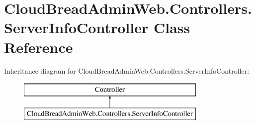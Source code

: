 \hypertarget{class_cloud_bread_admin_web_1_1_controllers_1_1_server_info_controller}{}\section{Cloud\+Bread\+Admin\+Web.\+Controllers.\+Server\+Info\+Controller Class Reference}
\label{class_cloud_bread_admin_web_1_1_controllers_1_1_server_info_controller}
Inheritance diagram for Cloud\+Bread\+Admin\+Web.\+Controllers.\+Server\+Info\+Controller\+:\begin{figure}[H]
\begin{center}
\leavevmode
\includegraphics[height=2.000000cm]{class_cloud_bread_admin_web_1_1_controllers_1_1_server_info_controller}
\end{center}
\end{figure}
